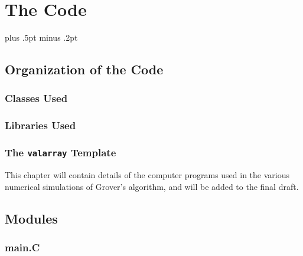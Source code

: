 

\chapter{The Code}
\label{chap:code}

\baselineskip=15.5pt plus .5pt minus .2pt


\section{Organization of the Code}

\subsection{Classes Used}

\subsection{Libraries Used}

\subsection{The \texttt{valarray} Template}

This chapter will contain details of the computer programs used
in the various numerical simulations of Grover's algorithm, and
will be added to the final draft.




\section{Modules}

\subsection{main.C}

